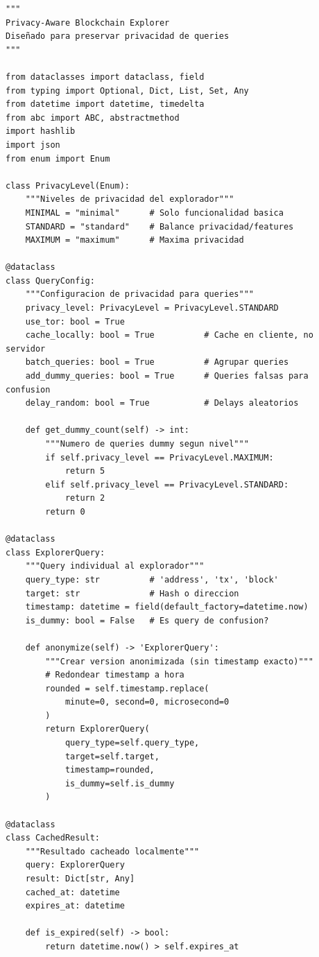 \documentclass[11pt,a4paper,twoside]{book}
\theoremstyle{definition}
\theoremstyle{remark}
\begin{document}
\begin{lstlisting}[style=python, caption={Explorador de blockchain privacy-aware}]
"""
Privacy-Aware Blockchain Explorer
Diseñado para preservar privacidad de queries
"""

from dataclasses import dataclass, field
from typing import Optional, Dict, List, Set, Any
from datetime import datetime, timedelta
from abc import ABC, abstractmethod
import hashlib
import json
from enum import Enum

class PrivacyLevel(Enum):
    """Niveles de privacidad del explorador"""
    MINIMAL = "minimal"      # Solo funcionalidad basica
    STANDARD = "standard"    # Balance privacidad/features
    MAXIMUM = "maximum"      # Maxima privacidad

@dataclass
class QueryConfig:
    """Configuracion de privacidad para queries"""
    privacy_level: PrivacyLevel = PrivacyLevel.STANDARD
    use_tor: bool = True
    cache_locally: bool = True          # Cache en cliente, no servidor
    batch_queries: bool = True          # Agrupar queries
    add_dummy_queries: bool = True      # Queries falsas para confusion
    delay_random: bool = True           # Delays aleatorios
    
    def get_dummy_count(self) -> int:
        """Numero de queries dummy segun nivel"""
        if self.privacy_level == PrivacyLevel.MAXIMUM:
            return 5
        elif self.privacy_level == PrivacyLevel.STANDARD:
            return 2
        return 0

@dataclass
class ExplorerQuery:
    """Query individual al explorador"""
    query_type: str          # 'address', 'tx', 'block'
    target: str              # Hash o direccion
    timestamp: datetime = field(default_factory=datetime.now)
    is_dummy: bool = False   # Es query de confusion?
    
    def anonymize(self) -> 'ExplorerQuery':
        """Crear version anonimizada (sin timestamp exacto)"""
        # Redondear timestamp a hora
        rounded = self.timestamp.replace(
            minute=0, second=0, microsecond=0
        )
        return ExplorerQuery(
            query_type=self.query_type,
            target=self.target,
            timestamp=rounded,
            is_dummy=self.is_dummy
        )

@dataclass
class CachedResult:
    """Resultado cacheado localmente"""
    query: ExplorerQuery
    result: Dict[str, Any]
    cached_at: datetime
    expires_at: datetime
    
    def is_expired(self) -> bool:
        return datetime.now() > self.expires_at


\end{lstlisting}
\end{document}

